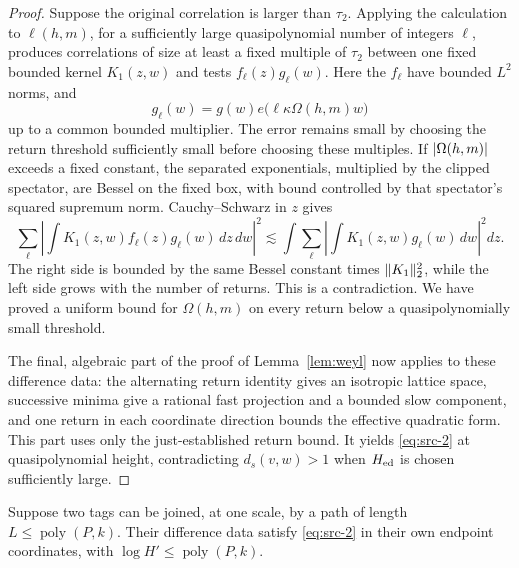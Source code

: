 \begin{proof}
Suppose the original correlation is larger than $\tau_2$.  Applying the calculation to $\ell(h,m)$, for a sufficiently
large quasipolynomial number of integers $\ell$, produces correlations
of size at least a fixed multiple of $\tau_2$ between one fixed bounded
kernel $K_1(z,w)$ and tests $f_\ell(z)g_\ell(w)$.  Here the
$f_\ell$ have bounded $L^2$ norms, and
\[
 g_\ell(w)=g(w)e\bigl(\ell\kappa\Omega(h,m)w\bigr)
\]
up to a common bounded multiplier.  The error remains small by choosing
the return threshold sufficiently small before choosing these multiples.
If $\lvert \Omega(h,m)\rvert$ exceeds a fixed constant, the separated
exponentials, multiplied by the clipped spectator, are Bessel on the
fixed box, with bound controlled by that spectator's squared supremum
norm.  Cauchy--Schwarz in $z$ gives
\[
 \sum_\ell\left|\int K_1(z,w)f_\ell(z)g_\ell(w)\,dz\,dw\right|^2
 \lesssim
 \int\sum_\ell\left|\int K_1(z,w)g_\ell(w)\,dw\right|^2dz.
\]
The right side is bounded by the same Bessel constant times
$\lVert K_1\rVert_2^2$, while the left side grows with the number of returns.
This is a contradiction.  We have proved a uniform bound for
$\Omega(h,m)$ on every return below a quasipolynomially small threshold.

The final, algebraic part of the proof of Lemma~\ref{lem:weyl} now
applies to these difference data: the alternating return identity gives
an isotropic lattice space, successive minima give a rational fast
projection and a bounded slow component, and one return in each
coordinate direction bounds the effective quadratic form.  This part
uses only the just-established return bound.  It yields
\eqref{eq:src-2} at quasipolynomial height, contradicting $d_s(v,w)>1$
when $H_{\rm ed}$ is chosen sufficiently large.
\end{proof}

\begin{lemma}
\label{lem:curvature-path}
Suppose two tags can be joined, at one scale, by a path of length
$L\le\operatorname{poly}(P,k)$.  Their difference data satisfy
\eqref{eq:src-2} in their own endpoint coordinates, with
$\log H'\le\operatorname{poly}(P,k)$.
\end{lemma}

